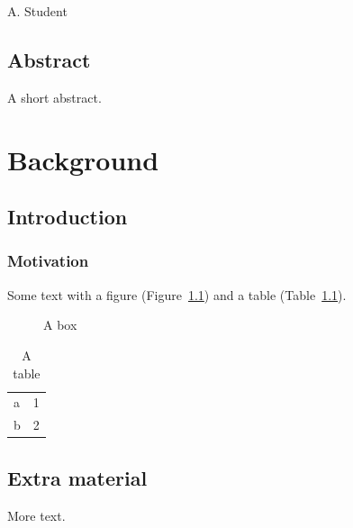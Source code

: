 \documentclass[11pt,a4paper,footinclude=true,headinclude=true]{scrreprt}
\begin{document}
\frenchspacing
{}
\begin{titlepage}
\centering{}\par\vspace{2em}A. Student\par
\end{titlepage}
\chapter*{Abstract}
A short abstract.
\tableofcontents
\listoffigures
\listoftables
\cleardoublepage{}
\part{Background}
\chapter{Introduction}
\section{Motivation}
Some text with a figure (Figure~\ref{fig:box}) and a table (Table~\ref{tab:t}).
\begin{figure}[h]\centering\fbox{\rule{0pt}{2em}\rule{4em}{0pt}}\caption{A box}\label{fig:box}\end{figure}
\begin{table}[h]\centering\begin{tabular}{lr}\toprule a & 1\\ b & 2\\\bottomrule\end{tabular}\caption{A table}\label{tab:t}\end{table}
\appendix
\chapter{Extra material}
More text.
\end{document}
